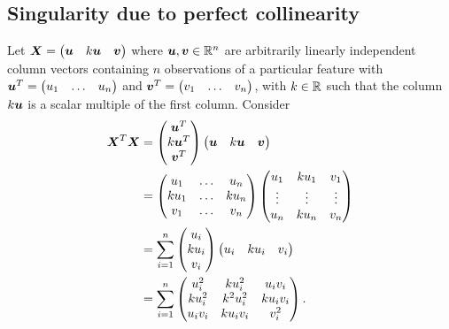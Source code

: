 \documentclass[12pt]{article}
\begin{document}
	\subsection{Singularity due to perfect collinearity \label{sec:append3}}
	Let $\boldsymbol{X}=\begin{pmatrix}
		\boldsymbol{u} & k\boldsymbol{u} & \boldsymbol{v}
	\end{pmatrix}$ where $\bmu,\bmv\in\Rn$ are arbitrarily linearly independent column vectors containing $n$ observations of a particular feature with $\boldsymbol{u}^T=\begin{pmatrix}
		u_1 & \ldots & u_n
	\end{pmatrix}$ and $\boldsymbol{v}^T=\begin{pmatrix}
		v_1 & \ldots & v_n
	\end{pmatrix}$, with $k\in\RR$ such that the column $k\boldsymbol{u}$ is a scalar multiple of the first column. Consider
	\begin{align*}
		\boldsymbol{X}^T\boldsymbol{X}&=\begin{pmatrix}
			\boldsymbol{u}^T \\ k\boldsymbol{u}^T \\ \boldsymbol{v}^T
		\end{pmatrix}\begin{pmatrix}
			\boldsymbol{u} & k\boldsymbol{u} & \boldsymbol{v}
		\end{pmatrix}\\
		&=\begin{pmatrix}
			u_1 & \ldots & u_n \\ ku_1 & \ldots & ku_n \\ v_1 & \ldots & v_n
		\end{pmatrix}\begin{pmatrix}
			u_1 & ku_1 & v_1 \\ \vdots & \vdots & \vdots \\ u_n & ku_n & v_n
		\end{pmatrix}\\
		&=\sum_{i=1}^{n}\begin{pmatrix}
			u_i \\ ku_i \\ v_i
		\end{pmatrix}\begin{pmatrix}
			u_i & ku_i & v_i
		\end{pmatrix}\\
		&=\sum_{i=1}^{n}\begin{pmatrix}
			u_i^2 & ku_i^2 & u_iv_i \\ 
			ku_i^2 & k^2u_i^2 & ku_iv_i \\
			u_iv_i & ku_iv_i & v_i^2
		\end{pmatrix}.
	\end{align*}
	
\end{document}
